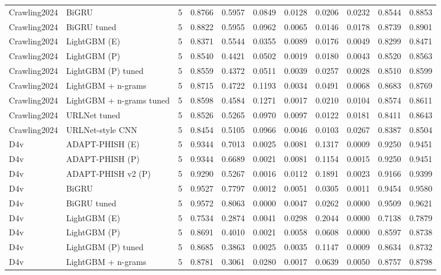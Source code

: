 \begin{table}[t]
\begin{tabular}{llrrrrrrrrr}
Crawling2024 & BiGRU & 5 & 0.8766 & 0.5957 & 0.0849 & 0.0128 & 0.0206 & 0.0232 & 0.8544 & 0.8853 \\
Crawling2024 & BiGRU tuned & 5 & 0.8822 & 0.5955 & 0.0962 & 0.0065 & 0.0146 & 0.0178 & 0.8739 & 0.8901 \\
Crawling2024 & LightGBM (E) & 5 & 0.8371 & 0.5544 & 0.0355 & 0.0089 & 0.0176 & 0.0049 & 0.8299 & 0.8471 \\
Crawling2024 & LightGBM (P) & 5 & 0.8540 & 0.4421 & 0.0502 & 0.0019 & 0.0180 & 0.0043 & 0.8520 & 0.8563 \\
Crawling2024 & LightGBM (P) tuned & 5 & 0.8559 & 0.4372 & 0.0511 & 0.0039 & 0.0257 & 0.0028 & 0.8510 & 0.8599 \\
Crawling2024 & LightGBM + n-grams & 5 & 0.8715 & 0.4722 & 0.1193 & 0.0034 & 0.0491 & 0.0068 & 0.8683 & 0.8769 \\
Crawling2024 & LightGBM + n-grams tuned & 5 & 0.8598 & 0.4584 & 0.1271 & 0.0017 & 0.0210 & 0.0104 & 0.8574 & 0.8611 \\
Crawling2024 & URLNet tuned & 5 & 0.8526 & 0.5265 & 0.0970 & 0.0097 & 0.0122 & 0.0181 & 0.8411 & 0.8643 \\
Crawling2024 & URLNet-style CNN & 5 & 0.8454 & 0.5105 & 0.0966 & 0.0046 & 0.0103 & 0.0267 & 0.8387 & 0.8504 \\
D4v & ADAPT-PHISH (E) & 5 & 0.9344 & 0.7013 & 0.0025 & 0.0081 & 0.1317 & 0.0009 & 0.9250 & 0.9451 \\
D4v & ADAPT-PHISH (P) & 5 & 0.9344 & 0.6689 & 0.0021 & 0.0081 & 0.1154 & 0.0015 & 0.9250 & 0.9451 \\
D4v & ADAPT-PHISH v2 (P) & 5 & 0.9290 & 0.5267 & 0.0016 & 0.0112 & 0.1891 & 0.0023 & 0.9166 & 0.9399 \\
D4v & BiGRU & 5 & 0.9527 & 0.7797 & 0.0012 & 0.0051 & 0.0305 & 0.0011 & 0.9454 & 0.9580 \\
D4v & BiGRU tuned & 5 & 0.9572 & 0.8063 & 0.0000 & 0.0047 & 0.0262 & 0.0000 & 0.9509 & 0.9621 \\
D4v & LightGBM (E) & 5 & 0.7534 & 0.2874 & 0.0041 & 0.0298 & 0.2044 & 0.0000 & 0.7138 & 0.7879 \\
D4v & LightGBM (P) & 5 & 0.8691 & 0.4010 & 0.0021 & 0.0058 & 0.0608 & 0.0000 & 0.8597 & 0.8738 \\
D4v & LightGBM (P) tuned & 5 & 0.8685 & 0.3863 & 0.0025 & 0.0035 & 0.1147 & 0.0009 & 0.8634 & 0.8732 \\
D4v & LightGBM + n-grams & 5 & 0.8781 & 0.3061 & 0.0280 & 0.0017 & 0.0639 & 0.0050 & 0.8757 & 0.8798 \\

\end{tabular}
\end{table}
